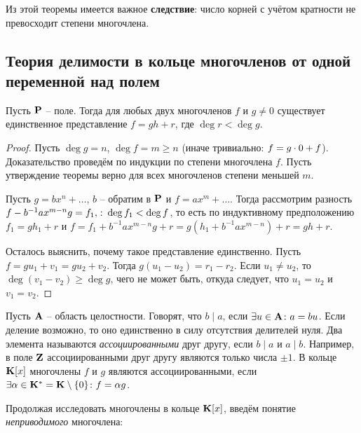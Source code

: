 Из этой теоремы имеется важное {\bfseries следствие}: число корней с учётом кратности не превосходит степени многочлена.

\subsection[Теория делимости многочленов]{Теория делимости в кольце многочленов от одной переменной над полем}

\begin{theorem}
  Пусть $\mathbf{P}$ -- поле. Тогда для любых двух многочленов $f$ и $g\ne0$
  существует единственное представление $f=gh+r$, где $\deg r<\deg
  g$.
\end{theorem}
\begin{proof}
  Пусть $\deg g=n$, $\deg f=m\ge n$ (иначе тривиально: $f\bw=g\cdot0+f$). Доказательство проведём по индукции по степени многочлена $f$. Пусть утверждение теоремы верно для всех многочленов степени меньшей $m$. 
  
  Пусть $g = bx^n+\dots$, $b$ -- обратим в $\mathbf{P}$ и $f=ax^m+\dots$. Тогда рассмотрим разность $f-b^{-1}ax^{m-n}g = f_1,\colon\deg f_1<\deg f$, то есть по индуктивному предположению $f_1=gh_1+r$ и $f=f_1+b^{-1}ax^{m-n}g+r=g(h_1+b^{-1}ax^{m-n})+r=gh+r$.
  
  Осталось выяснить, почему такое представление единственно. Пусть $f=gu_1+v_1=gu_2+v_2$. Тогда $g(u_1-u_2)=r_1-r_2$. Если $u_1\ne u_2$, то $\deg (v_1-v_2)\ge\deg g$, чего не может быть, откуда следует, что $u_1=u_2$ и $v_1=v_2$.
\end{proof}

Пусть $\mathbf{A}$ -- область целостности. Говорят, что $b\mid a$, если $\exists u\in\mathbf{A}\colon a=bu$. Если деление возможно, то оно единственно в силу отсутствия делителей нуля. Два элемента называются \emph{ассоциированными} друг другу, если $b\mid a$ и $a\mid b$. Например, в поле $\mathbf{Z}$ ассоциированными друг другу являются только числа $\pm1$. В кольце $\mathbf{K}[x]$ многочлены $f$ и $g$ являются ассоциированными, если $\exists\alpha\in\mathbf{K}^*=\mathbf{K}\setminus\{0\}\colon f=\alpha g$.

Продолжая исследовать многочлены в кольце $\mathbf{K}[x]$, введём понятие \emph{неприводимого} многочлена:

